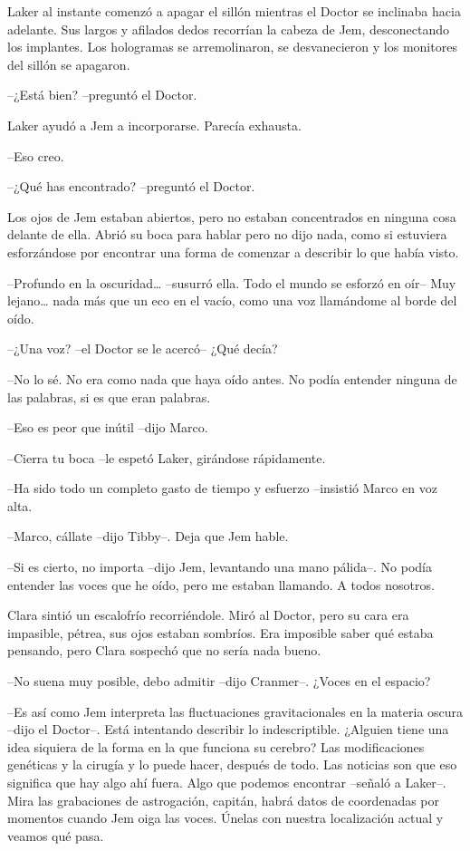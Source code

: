 {Laker al instante comenzó a apagar el sillón mientras el Doctor se
 inclinaba hacia adelante. Sus largos y afilados dedos recorrían la
 cabeza de Jem, desconectando los implantes. Los hologramas se
 arremolinaron, se desvanecieron y los monitores del sillón se
apagaron.}

{--¿Está bien? --preguntó el Doctor.}

{Laker ayudó a Jem a incorporarse. Parecía exhausta.}

{--Eso creo.}

{--¿Qué has encontrado? --preguntó el Doctor.}

{Los ojos de Jem estaban abiertos, pero no estaban concentrados en
 ninguna cosa delante de ella. Abrió su boca para hablar pero no dijo
 nada, como si estuviera esforzándose por encontrar una forma de comenzar
a describir lo que había visto.}

{--Profundo en la oscuridad\ldots{} --susurró ella. Todo el mundo se
 esforzó en oír-- Muy lejano\ldots{} nada más que un eco en el vacío,
como una voz llamándome al borde del oído.}

{--¿Una voz? --el Doctor se le acercó-- ¿Qué decía?}

{--No lo sé. No era como nada que haya oído antes. No podía entender
ninguna de las palabras, si es que eran palabras.}

{--Eso es peor que inútil --dijo Marco.}

{--Cierra tu boca --le espetó Laker, girándose rápidamente.}

{--Ha sido todo un completo gasto de tiempo y esfuerzo --insistió Marco
en voz alta.}

{--Marco, cállate --dijo Tibby--. Deja que Jem hable.}

{--Si es cierto, no importa --dijo Jem, levantando una mano pálida--. No
 podía entender las voces que he oído, pero me estaban llamando. A todos
nosotros.}

{Clara sintió un escalofrío recorriéndole. Miró al Doctor, pero su cara
 era impasible, pétrea, sus ojos estaban sombríos. Era imposible saber
qué estaba pensando, pero Clara sospechó que no sería nada bueno.}

{--No suena muy posible, debo admitir --dijo Cranmer--. ¿Voces en el
espacio?}

{--Es así como Jem interpreta las fluctuaciones gravitacionales en la
 materia oscura --dijo el Doctor--. Está intentando describir lo
 indescriptible. ¿Alguien tiene una idea siquiera de la forma en la que
 funciona su cerebro? Las modificaciones genéticas y la cirugía y lo
 puede hacer, después de todo. Las noticias son que eso significa que hay
 algo ahí fuera. Algo que podemos encontrar --señaló a Laker--. Mira las
 grabaciones de astrogación, capitán, habrá datos de coordenadas por
 momentos cuando Jem oiga las voces. Únelas con nuestra localización
actual y veamos qué pasa.}

